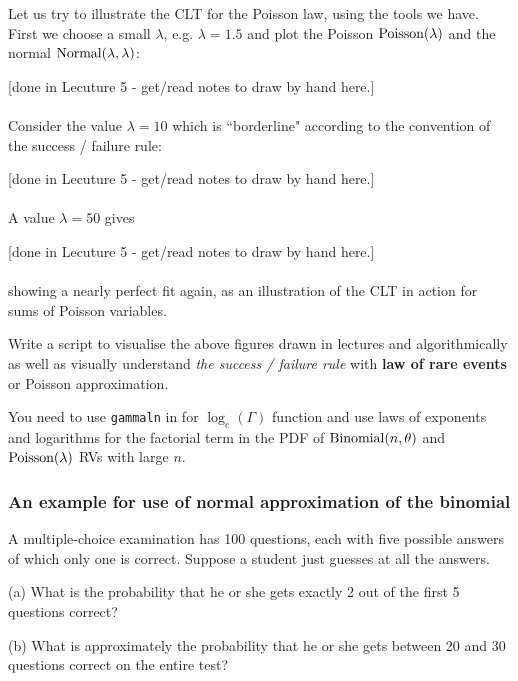 Let us try to illustrate the CLT for the Poisson law, using the tools we
have. First we choose a small $\lambda $, e.g. $\lambda =1.5$ and plot the
Poisson $\mbox{{\rm Poisson}}(\lambda )$ and the normal $\mbox{{\rm Normal}}(\lambda ,\lambda )$:


{\scriptsize [done in Lecuture 5 - get/read notes to draw by hand here.]}\\
\vspace{3cm} 
~\\


Consider the value $\lambda =10$ which is ``borderline" according to the
convention of the success / failure rule: 


{\scriptsize [done in Lecuture 5 - get/read notes to draw by hand here.]}\\
\vspace{3cm} 
~\\


A value $\lambda =50$ gives 


{\scriptsize [done in Lecuture 5 - get/read notes to draw by hand here.]}\\
\vspace{3cm} 
~\\


showing a nearly perfect
fit again, as an illustration of the CLT in action for sums of Poisson
variables.

\begin{labwork}\label{LW:VisualiseSuccessFailureRulePoisson}
Write a \Matlab script to visualise the above figures drawn in lectures and algorithmically as well as visually understand {\em the success / failure rule} with {\bf law of rare events} or Poisson approximation.

You need to use {\tt gammaln} in \Matlab for $\log_e(\Gamma)$ function and use laws of exponents and logarithms for the factorial term in the PDF of $\mbox{{\rm Binomial}}(n,\theta)$ and $\mbox{{\rm Poisson}}(\lambda)$ RVs with large $n$.
\end{labwork}

\subsubsection{An example for use of normal approximation of the binomial}

\begin{Exercise}[label={ExMultipleChoiceQuestions}]
A multiple-choice examination has 100 questions, each
with five possible answers of which only one is correct. Suppose a student
just guesses at all the answers.

(a) What is the probability that he or she gets exactly 2 out of the first 5
questions correct?

(b) What is approximately the probability that he or she gets between 20 and
30 questions correct on the entire test?

\end{Exercise}

